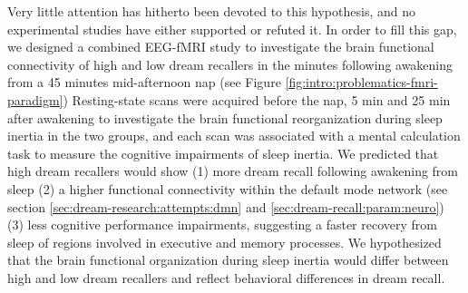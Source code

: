Very little attention has hitherto been devoted to this hypothesis, and no experimental studies have either supported or refuted it. In order to fill this gap, we designed a combined EEG-fMRI study to investigate the brain functional connectivity of high and low dream recallers in the minutes following awakening from a 45 minutes mid-afternoon nap (see Figure \ref{fig:intro:problematics-fmri-paradigm}) Resting-state scans were acquired before the nap, 5 min and 25 min after awakening to investigate the brain functional reorganization during sleep inertia in the two groups, and each scan was associated with a mental calculation task to measure the cognitive impairments of sleep inertia. We predicted that high dream recallers would show (1) more dream recall following awakening from sleep (2) a higher functional connectivity within the default mode network (see section \ref{sec:dream-research:attempts:dmn} and \ref{sec:dream-recall:param:neuro}) (3) less cognitive performance impairments, suggesting a faster recovery from sleep of regions involved in executive and memory processes. We hypothesized that the brain functional organization during sleep inertia would differ between high and low dream recallers and reflect behavioral differences in dream recall.

